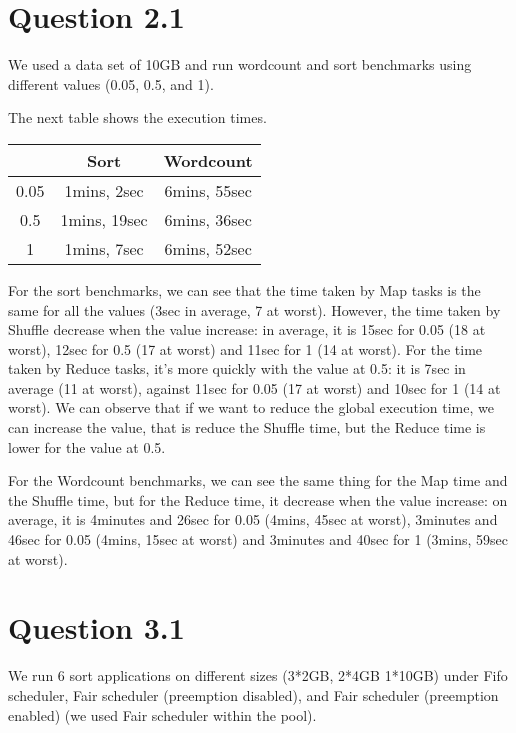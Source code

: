 \documentclass{article}
\begin{document}
\section*{Question 2.1}


We used a data set of 10GB and run wordcount and sort benchmarks using
different values (0.05, 0.5, and 1).

The next table shows the execution times.

\begin{center}
\begin{tabular}{|c|c|c|}
\hline
\ & Sort & Wordcount \\
\hline
0.05 & 1mins, 2sec & 6mins, 55sec \\
\hline
0.5 & 1mins, 19sec & 6mins, 36sec \\
\hline
1 & 1mins, 7sec & 6mins, 52sec \\
\hline
\end{tabular}
\end{center}

For the sort benchmarks, we can see that the time taken by Map tasks is the same for all the values (3sec in average, 7 at worst).
However, the time taken by Shuffle decrease when the value increase: in average, it is 15sec for 0.05 (18 at worst), 12sec for 0.5 (17 at worst) and 11sec for 1 (14 at worst). For the time taken by Reduce tasks, it's more quickly with the value at 0.5: it is 7sec in average (11 at worst), against 11sec for 0.05 (17 at worst) and 10sec for 1 (14 at worst).
We can observe that if we want to reduce the global execution time, we can increase the value, that is reduce the Shuffle time, but the Reduce time is lower for the value at 0.5.

For the Wordcount benchmarks, we can see the same thing for the Map time and the Shuffle time, but for the Reduce time, it decrease when the value increase: on average, it is 4minutes and 26sec for 0.05 (4mins, 45sec at worst), 3minutes and 46sec for 0.05 (4mins, 15sec at worst) and 3minutes and 40sec for 1 (3mins, 59sec at worst).

\section*{Question 3.1}


We run 6 sort applications on different sizes (3*2GB, 2*4GB 1*10GB) under Fifo scheduler, Fair scheduler (preemption disabled), and Fair scheduler
(preemption enabled) (we used Fair scheduler within the pool).
\end{document}
